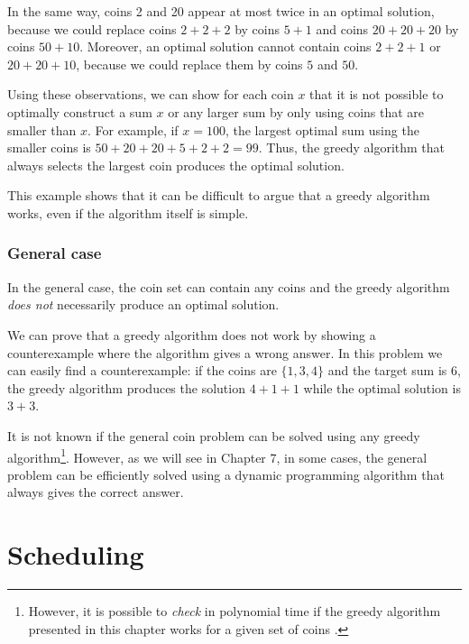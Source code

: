 In the same way, coins 2 and 20 appear
at most twice in an optimal solution,
because we could replace
coins $2+2+2$ by coins $5+1$ and
coins $20+20+20$ by coins $50+10$.
Moreover, an optimal solution cannot contain
coins $2+2+1$ or $20+20+10$,
because we could replace them by coins $5$ and $50$.

Using these observations,
we can show for each coin $x$ that
it is not possible to optimally construct
a sum $x$ or any larger sum by only using coins
that are smaller than $x$.
For example, if $x=100$, the largest optimal
sum using the smaller coins is  $50+20+20+5+2+2=99$.
Thus, the greedy algorithm that always selects
the largest coin produces the optimal solution.

This example shows that it can be difficult
to argue that a greedy algorithm works,
even if the algorithm itself is simple.

\subsubsection{General case}

In the general case, the coin set can contain any coins
and the greedy algorithm \emph{does not} necessarily produce
an optimal solution.

We can prove that a greedy algorithm does not work
by showing a counterexample
where the algorithm gives a wrong answer.
In this problem we can easily find a counterexample:
if the coins are $\{1,3,4\}$ and the target sum
is 6, the greedy algorithm produces the solution
$4+1+1$ while the optimal solution is $3+3$.

It is not known if the general coin problem
can be solved using any greedy algorithm\footnote{However, it is possible
to \emph{check} in polynomial time
if the greedy algorithm presented in this chapter works for
a given set of coins \cite{pea05}.}.
However, as we will see in Chapter 7,
in some cases,
the general problem can be efficiently
solved using a dynamic
programming algorithm that always gives the
correct answer.

\section{Scheduling}

